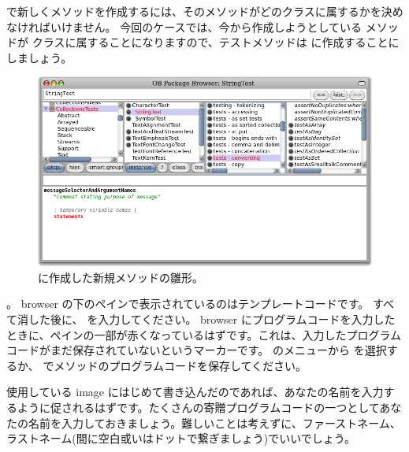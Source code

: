 \documentclass[a4paper,10pt,twoside]{book}
\begin{document}
\pharo で新しくメソッドを作成するには、そのメソッドがどのクラスに属するかを決めなければいけません。
今回のケースでは、今から作成しようとしている  メソッドが  クラスに属することになりますので、テストメソッドは  に作成することにしましょう。

\begin{figure}[hbt]
\centerline {\includegraphics[width=\textwidth]{StringTest-newMethodTemplate}}
\caption{ に作成した新規メソッドの雛形。
}
\end{figure}

。
browser の下のペインで表示されているのはテンプレートコードです。
すべて消した後に、 を入力してください。
browser にプログラムコードを入力したときに、ペインの一部が赤くなっているはずです。これは、入力したプログラムコードがまだ保存されていないというマーカーです。
\actclick のメニューから  を選択するか、 でメソッドのプログラムコードを保存してください。

使用している image にはじめて書き込んだのであれば、あなたの名前を入力するように促されるはずです。たくさんの寄贈プログラムコードの一つとしてあなたの名前を入力しておきましょう。難しいことは考えずに、ファーストネーム、ラストネーム(間に空白或いはドットで繋ぎましょう)でいいでしょう。

\end{document}
